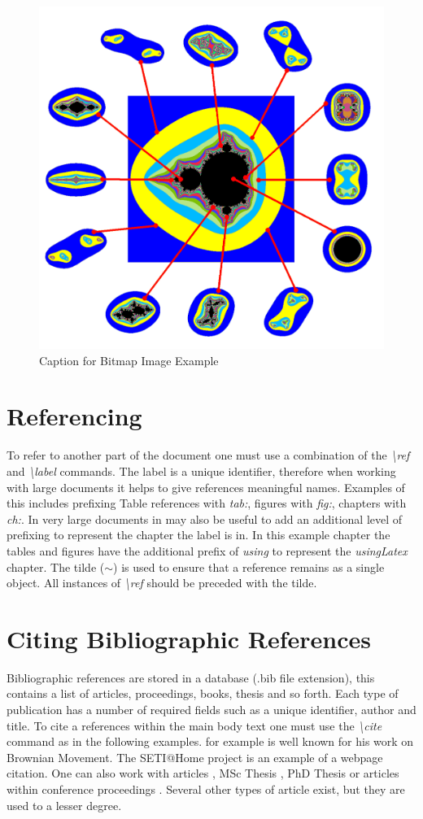 \begin{figure}[H]
\begin{center}
\includegraphics[width=.34\linewidth]{usingLatex/images/samplepng}
\caption{Caption for Bitmap Image Example} \label{fig:using:samplepngImage}
\end{center}
\end{figure}

\section{Referencing}

To refer to another part of the document one must use a combination of the \emph{\textbackslash ref} and \emph{\textbackslash label} commands. The label is a unique identifier, therefore when working with large documents it helps to give references meaningful names. Examples of this includes prefixing Table references with \emph{tab:}, figures with \emph{fig:}, chapters with \emph{ch:}. In very large documents in may also be useful to add an additional level of prefixing to represent the chapter the label is in. In this example chapter the tables and figures have the additional prefix of \emph{using} to represent the \emph{usingLatex} chapter. The tilde ($\sim$) is used to ensure that a reference remains as a single object. All instances of \emph{\textbackslash ref} should be preceded with the tilde.

\section{Citing Bibliographic References}

Bibliographic references are stored in a database (.bib file extension), this contains a list of articles, proceedings, books, thesis and so forth. Each type of publication has a number of required fields such as a unique identifier, author and title. To cite a references within the main body text one must use the \emph{\textbackslash cite} command as in the following examples. \cite{book:einsteinBrownianMovement} for example is well known for his work on Brownian Movement. The SETI@Home project \cite{web:berkeleyBOINC} is an example of a webpage citation. One can also work with articles \cite{art:Moller2003HWRastArch}, MSc Thesis \cite{msc:Edberg2007FluxgateMagnetometer}, PhD Thesis \cite{phd:Grace2004MiddlewareMobile} or articles within conference proceedings \cite{proc:Park2006UIMgtRmtRobots}. Several other types of article exist, but they are used to a lesser degree.

